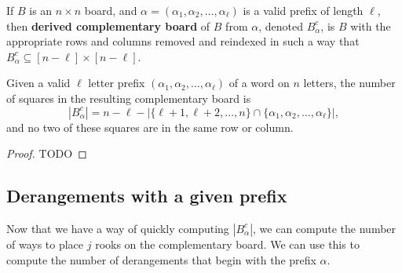 \begin{definition}
  If $B$ is an $n \times n$ board, and
  $\alpha = (\alpha_1, \alpha_2, \dots, \alpha_\ell)$ is a valid prefix of length
  $\ell$, then \textbf{derived complementary board} of $B$ from $\alpha$,
  denoted $B^c_\alpha$,
  is $B$ with the appropriate rows and columns removed and reindexed in such
  a way that $B^c_\alpha \subseteq [n - \ell] \times [n - \ell]$.
\end{definition}
\begin{lemma}
  Given a valid $\ell$ letter prefix $(\alpha_1, \alpha_2, \dots, \alpha_\ell)$
  of a word on $n$ letters,
  the number of squares in the resulting complementary board is \[
    |B_\alpha^c| = n - \ell - |\{\ell+1, \ell+2, \dots, n\} \cap \{\alpha_1, \alpha_2, \dots, \alpha_\ell\}|,
  \] and no two of these squares are in the same row or column.
\end{lemma}
\begin{proof}
  TODO
\end{proof}

\subsection{Derangements with a given prefix}
Now that we have a way of quickly computing $|B_\alpha^c|$, we can compute the
number of ways to place $j$ rooks on the complementary board. We can use this
to compute the number of derangements that begin with the prefix $\alpha$.

